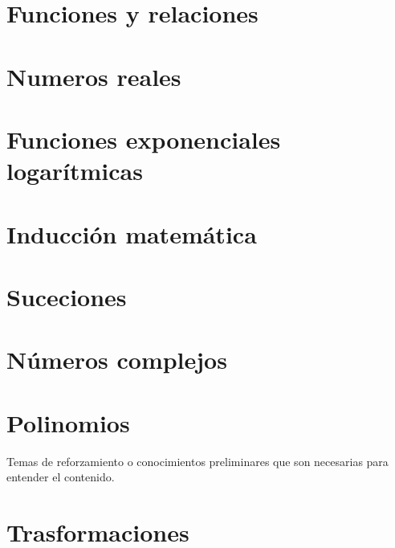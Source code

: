 \documentclass[
  16pt,
]{krantz}
\theoremstyle{definition}
\theoremstyle{definition}
\theoremstyle{definition}
\theoremstyle{definition}
\theoremstyle{remark}
\begin{document}
\hypertarget{funciones-y-relaciones}{%
\chapter{Funciones y relaciones}\label{funciones-y-relaciones}}

\hypertarget{numeros-reales}{%
\chapter{Numeros reales}\label{numeros-reales}}

\hypertarget{funciones-exponenciales-logaruxedtmicas}{%
\chapter{Funciones exponenciales logarítmicas}\label{funciones-exponenciales-logaruxedtmicas}}

\hypertarget{inducciuxf3n-matemuxe1tica}{%
\chapter{Inducción matemática}\label{inducciuxf3n-matemuxe1tica}}

\hypertarget{suceciones}{%
\chapter{Suceciones}\label{suceciones}}

\hypertarget{nuxfameros-complejos}{%
\chapter{Números complejos}\label{nuxfameros-complejos}}

\hypertarget{polinomios}{%
\chapter{Polinomios}\label{polinomios}}

\hypertarget{appendix-apendice}{%
\appendix {}}


Temas de reforzamiento o conocimientos preliminares que son necesarias para entender el contenido.

\hypertarget{trasformaciones}{%
\chapter{Trasformaciones}\label{trasformaciones}}

  

\printindex
\end{document}
